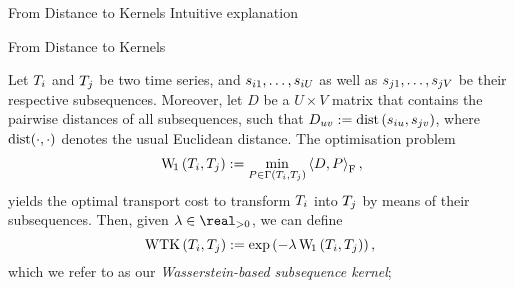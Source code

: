\begin{frame}{From Distance to Kernels}
    Intuitive explanation
\end{frame}

\begin{frame}{From Distance to Kernels}
  \begin{definition}
  \normalsize
  Let $T_i$ and $T_j$ be two time series, and $s_{i1}, \dots, s_{iU}$
  as well as $s_{j1}, \dots, s_{jV}$ be their respective
  subsequences. Moreover, let $D$ be a $U \times V$ matrix that contains
  the pairwise distances of all subsequences, such that
  $D_{uv} := \operatorname{dist}\left(s_{iu}, s_{jv}\right)$,
  where $\operatorname{dist}(\cdot, \cdot)$ denotes the usual Euclidean distance.
  The optimisation problem
  \begin{equation}\
   \operatorname{W\!}_1\left(T_i, T_j\right) := \min_{P \in \Gamma\left(T_i, T_j\right)} \left\langle D, P \right\rangle_{\mathrm{F}},
    \label{eq:Our distance}
  \end{equation}
  yields the optimal transport cost to transform $T_i$
  into $T_j$ by means of their subsequences. Then, given
  $\lambda\in\real_{> 0}$, we can define
  \begin{equation}
    \operatorname{WTK}\left(T_i, T_j\right) := \exp\left(-\lambda \operatorname{W\!}_1\left(T_i, T_j\right)\right),
    \label{eq:Our kernel}
  \end{equation}
  which we refer to as our \emph{Wasserstein-based subsequence kernel};
  \end{definition}
\end{frame}



\renewcommand{\algorithmicrequire}{\textbf{Input:}}
\renewcommand{\algorithmicensure}{\textbf{Output:}}
\renewcommand{\algorithmiccomment}[1]{\qquad \textcolor{ETHf}{//} \textcolor{ETHf}{#1}}

